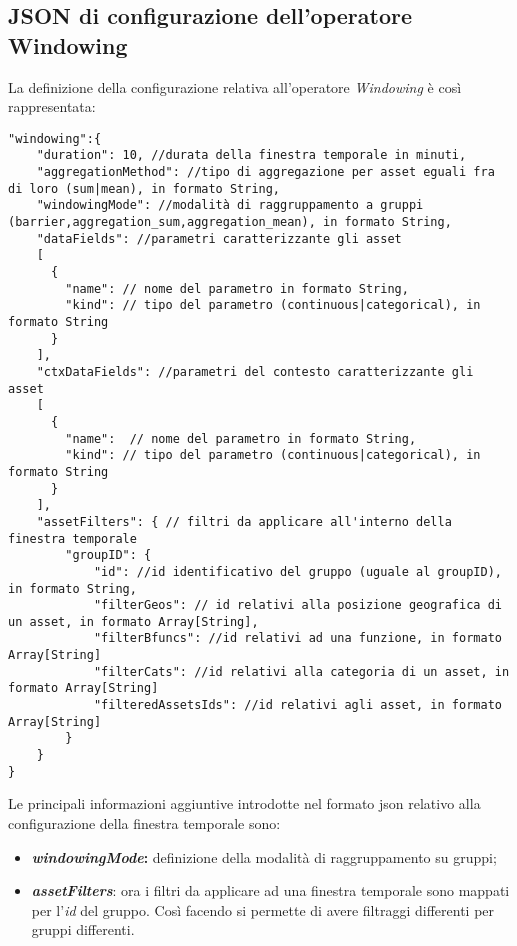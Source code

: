 \subsection{JSON di configurazione dell'operatore Windowing}\label{sec:json-windowing}
La definizione della configurazione relativa all'operatore \textit{Windowing} è così rappresentata:

\begin{verbatim}
"windowing":{
    "duration": 10, //durata della finestra temporale in minuti,
    "aggregationMethod": //tipo di aggregazione per asset eguali fra di loro (sum|mean), in formato String,
    "windowingMode": //modalità di raggruppamento a gruppi (barrier,aggregation_sum,aggregation_mean), in formato String,
    "dataFields": //parametri caratterizzante gli asset
    [
      {
        "name": // nome del parametro in formato String,
        "kind": // tipo del parametro (continuous|categorical), in formato String
      }
    ],
    "ctxDataFields": //parametri del contesto caratterizzante gli asset 
    [
      {
        "name":  // nome del parametro in formato String,
        "kind": // tipo del parametro (continuous|categorical), in formato String
      }
    ],
    "assetFilters": { // filtri da applicare all'interno della finestra temporale
        "groupID": {
            "id": //id identificativo del gruppo (uguale al groupID), in formato String,
            "filterGeos": // id relativi alla posizione geografica di un asset, in formato Array[String],
            "filterBfuncs": //id relativi ad una funzione, in formato Array[String]
            "filterCats": //id relativi alla categoria di un asset, in formato Array[String]
            "filteredAssetsIds": //id relativi agli asset, in formato Array[String]
        } 
    }
}
\end{verbatim}
Le principali informazioni aggiuntive introdotte nel formato \gls{json} relativo alla configurazione della finestra temporale sono:
\begin{itemize}
	\item{\textbf{\textit{windowingMode}:} definizione della modalità di raggruppamento su gruppi;}
	\item{\textbf{\textit{assetFilters}}: ora i filtri da applicare ad una finestra temporale sono mappati per l'\textit{id} del gruppo. Così facendo si permette di avere filtraggi differenti per gruppi differenti.}
\end{itemize} 


